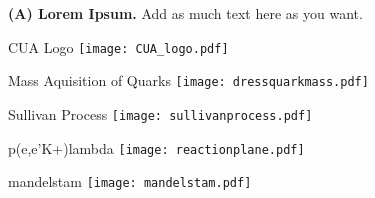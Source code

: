 
{\textbf{(A) Lorem Ipsum.} Add as much text here as you want.}

\begin{Mfigure}{CUA Logo}
 \centering
 \texttt{[image: CUA\_logo.pdf]}
\label{fig:titlepagelogo}
\end{Mfigure}

%
%

\begin{Mfigure}{Mass Aquisition of Quarks}
  \centering
  \texttt{[image: dressquarkmass.pdf]}
  \caption{The dressed-quark mass function, M(p), versus momentum which shows the rapid aquisition of mass via the gluon cloud as a result of DCSB. The DSE results are the solid curves and the pseudodata points are produced from numerical simulations of lattice-regularized QCD \cite{roberts_hadron_2015}.}
  \label{fig:1-1_dressquarkmass}
\end{Mfigure}

\begin{Mfigure}{Sullivan Process}
  \centering
  \texttt{[image: sullivanprocess.pdf]}
  \caption{Diagram showing the Sullivan Process for acessing the pion's (a) elastic form factor and (b) parton distribution functions (PDFs) \cite{qin_off-shell_2018}.}
  \label{fig:1-1_sullivanprocess}
\end{Mfigure}

\begin{Mfigure}{p(e,e'K+)lambda}
  \centering
  \texttt{[image: reactionplane.pdf]}
  \caption{Diagram of reaction and scattering planes for $p(e,e'K^2)\Lambda$ reaction.}
  \label{fig:1-1_reactionplane}
\end{Mfigure}

\begin{Mfigure}{mandelstam}
  \centering
  \texttt{[image: mandelstam.pdf]}
  \caption{Diagram comparing the different Mandelstam channels.}
  \label{fig:1-1_mandelstam}
\end{Mfigure}

